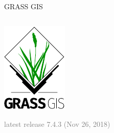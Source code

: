 \documentclass[xcolor={dvipsnames,usenames},beamer,aspectratio=169]{beamer}
\begin{document}
\begin{frame}{GRASS GIS}
\begin{columns}
\begin{column}{0.25\textwidth}
\begin{center}
  \includegraphics[width=\textwidth]{logos/grass_gis}
\end{center}

\vspace*{-2.5ex}

\textcolor{gray}{
\scriptsize
latest release 7.4.3
\tiny
(Nov 26, 2018)
}

\end{column}
\end{columns}

\end{frame}
\end{document}
